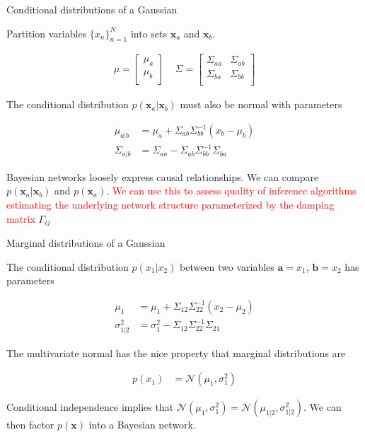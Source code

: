 \documentclass[aspectratio=1610]{beamer}					%
\begin{document}
\begin{frame}{Conditional distributions of a Gaussian}

Partition variables $\{x_{n}\}_{n=1}^{N}$ into sets $\bm{x}_{a}$ and $\bm{x}_{b}$. 

\begin{align*}
\mu = \begin{bmatrix} 
    \mu_{a}\\
	\mu_{b}\\
    \end{bmatrix}
\;\;\;\;
\Sigma = \begin{bmatrix} 
    \Sigma_{aa} & \Sigma_{ab}\\
    \Sigma_{ba} & \Sigma_{bb}\\
    \end{bmatrix}
\end{align*}

The conditional distribution $p(\bm{x}_{a}|\bm{x}_{b})$ must also be normal with parameters

\begin{align*}
\mu_{a|b} &= \mu_{a} + \Sigma_{ab}\Sigma_{bb}^{-1}(x_{b}-\mu_{b})\\
\Sigma_{a|b} &= \Sigma_{aa}-\Sigma_{ab}\Sigma_{bb}^{-1}\Sigma_{ba}
\end{align*}

Bayesian networks loosely express causal relationships. We can compare $p(\bm{x}_{a}|\bm{x}_{b})$ and $p(\bm{x}_{a})$. \textcolor{red}{We can use this to assess quality of inference algorithms estimating the underlying network structure parameterized by the damping matrix} $\Gamma_{ij}$

\end{frame}

\begin{frame}{Marginal distributions of a Gaussian}

The conditional distribution $p(x_{1}|x_{2})$ between two variables $\bm{a}=x_{1}$, $\bm{b}=x_{2}$ has parameters

\begin{align*}
\mu_{1} &= \mu_{1} + \Sigma_{12}\Sigma_{22}^{-1}(x_{2}-\mu_{2})\\
\sigma_{1|2}^{2} &= \sigma_{1}^{2} -\Sigma_{12}\Sigma_{22}^{-1}\Sigma_{21}
\end{align*}

The multivariate normal has the nice property that marginal distributions are

\begin{align*}
p(x_{1}) &= \mathcal{N}\left(\mu_{1},\sigma_{1}^{2}\right)
\end{align*}

Conditional independence implies that $\mathcal{N}\left(\mu_{1},\sigma_{1}^{2}\right) = \mathcal{N}\left(\mu_{1|2},\sigma_{1|2}^{2}\right)$. We can then factor $p(\bm{x})$ into a Bayesian network. \\


\end{frame}
\end{document}
